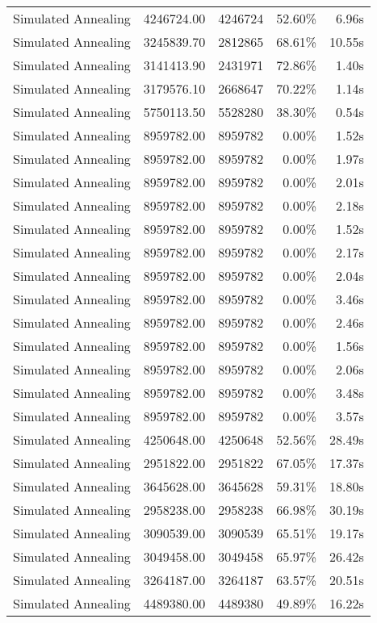 \begin{table}[ht]
\begin{tabular}{|r|r|r|r|r|}
Simulated Annealing & 4246724.00 & 4246724 & 52.60\% & 6.96s\\
Simulated Annealing & 3245839.70 & 2812865 & 68.61\% & 10.55s\\
Simulated Annealing & 3141413.90 & 2431971 & 72.86\% & 1.40s\\
Simulated Annealing & 3179576.10 & 2668647 & 70.22\% & 1.14s\\
Simulated Annealing & 5750113.50 & 5528280 & 38.30\% & 0.54s\\
Simulated Annealing & 8959782.00 & 8959782 & 0.00\% & 1.52s\\
Simulated Annealing & 8959782.00 & 8959782 & 0.00\% & 1.97s\\
Simulated Annealing & 8959782.00 & 8959782 & 0.00\% & 2.01s\\
Simulated Annealing & 8959782.00 & 8959782 & 0.00\% & 2.18s\\
Simulated Annealing & 8959782.00 & 8959782 & 0.00\% & 1.52s\\
Simulated Annealing & 8959782.00 & 8959782 & 0.00\% & 2.17s\\
Simulated Annealing & 8959782.00 & 8959782 & 0.00\% & 2.04s\\
Simulated Annealing & 8959782.00 & 8959782 & 0.00\% & 3.46s\\
Simulated Annealing & 8959782.00 & 8959782 & 0.00\% & 2.46s\\
Simulated Annealing & 8959782.00 & 8959782 & 0.00\% & 1.56s\\
Simulated Annealing & 8959782.00 & 8959782 & 0.00\% & 2.06s\\
Simulated Annealing & 8959782.00 & 8959782 & 0.00\% & 3.48s\\
Simulated Annealing & 8959782.00 & 8959782 & 0.00\% & 3.57s\\
Simulated Annealing & 4250648.00 & 4250648 & 52.56\% & 28.49s\\
Simulated Annealing & 2951822.00 & 2951822 & 67.05\% & 17.37s\\
Simulated Annealing & 3645628.00 & 3645628 & 59.31\% & 18.80s\\
Simulated Annealing & 2958238.00 & 2958238 & 66.98\% & 30.19s\\
Simulated Annealing & 3090539.00 & 3090539 & 65.51\% & 19.17s\\
Simulated Annealing & 3049458.00 & 3049458 & 65.97\% & 26.42s\\
Simulated Annealing & 3264187.00 & 3264187 & 63.57\% & 20.51s\\
Simulated Annealing & 4489380.00 & 4489380 & 49.89\% & 16.22s\\

\end{tabular}
\end{table}
